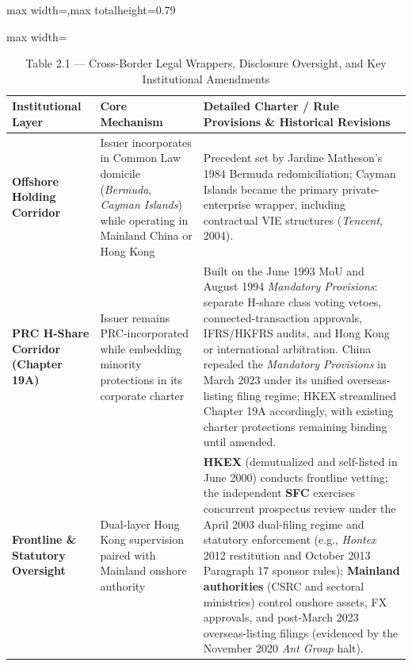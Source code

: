 \documentclass[11pt,letterpaper]{article}
\begin{document}
\begin{table}[!htbp]
\centering
\caption*{Table 2.1 — Cross-Border Legal Wrappers, Disclosure Oversight, and Key Institutional Amendments}
\begin{adjustbox}{max width=\textwidth,max totalheight=0.79\textheight}
\begin{minipage}{\textwidth}\centering
\footnotesize
\setlength{\tabcolsep}{3.5pt}
\renewcommand{\arraystretch}{1.18}
\begin{adjustbox}{max width=\textwidth}
\begin{tabular}{>{\raggedright\arraybackslash}p{3.91cm}>{\raggedright\arraybackslash}p{5.80cm}>{\raggedright\arraybackslash}p{5.80cm}}
\toprule
Institutional Layer & Core Mechanism & Detailed Charter / Rule Provisions \& Historical Revisions \\
\midrule
\textbf{Offshore Holding Corridor} & Issuer incorporates in Common Law domicile (\textit{Bermuda}, \textit{Cayman Islands}) while operating in Mainland China or Hong Kong & Precedent set by Jardine Matheson's 1984 Bermuda redomiciliation; Cayman Islands became the primary private-enterprise wrapper, including contractual VIE structures (\textit{Tencent}, 2004). \\
\textbf{PRC H-Share Corridor (Chapter 19A)} & Issuer remains PRC-incorporated while embedding minority protections in its corporate charter & Built on the June 1993 MoU and August 1994 \textit{Mandatory Provisions}: separate H-share class voting vetoes, connected-transaction approvals, IFRS/HKFRS audits, and Hong Kong or international arbitration. China repealed the \textit{Mandatory Provisions} in March 2023 under its unified overseas-listing filing regime; HKEX streamlined Chapter 19A accordingly, with existing charter protections remaining binding until amended. \\
\textbf{Frontline \& Statutory Oversight} & Dual-layer Hong Kong supervision paired with Mainland onshore authority & \textbf{HKEX} (demutualized and self-listed in June 2000) conducts frontline vetting; the independent \textbf{SFC} exercises concurrent prospectus review under the April 2003 dual-filing regime and statutory enforcement (e.g., \textit{Hontex} 2012 restitution and October 2013 Paragraph 17 sponsor rules); \textbf{Mainland authorities} (CSRC and sectoral ministries) control onshore assets, FX approvals, and post-March 2023 overseas-listing filings (evidenced by the November 2020 \textit{Ant Group} halt). \\
\bottomrule
\end{tabular}

\end{adjustbox}
\end{minipage}
\end{adjustbox}
\end{table}
\end{document}
